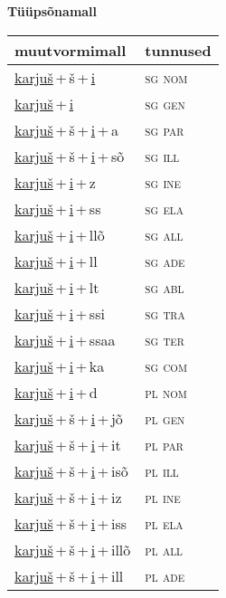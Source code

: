 
\vspace{1.8em}
\begin{minipage}{\textwidth}
\textbf{Tüüpsõnamall \,}\\

\begin{sideways}
\begin{tabular}{l l}
muutvormimall & tunnused \\
\hline
\underline{karjuš}\,+\,š\,+\,\underline{i} & \textsc{ sg nom } \\
\underline{karjuš}\,+\,\underline{i} & \textsc{ sg gen } \\
\underline{karjuš}\,+\,š\,+\,\underline{i}\,+\,a & \textsc{ sg par } \\
\underline{karjuš}\,+\,š\,+\,\underline{i}\,+\,sõ & \textsc{ sg ill } \\
\underline{karjuš}\,+\,\underline{i}\,+\,z & \textsc{ sg ine } \\
\underline{karjuš}\,+\,\underline{i}\,+\,ss & \textsc{ sg ela } \\
\underline{karjuš}\,+\,\underline{i}\,+\,llõ & \textsc{ sg all } \\
\underline{karjuš}\,+\,\underline{i}\,+\,ll & \textsc{ sg ade } \\
\underline{karjuš}\,+\,\underline{i}\,+\,lt & \textsc{ sg abl } \\
\underline{karjuš}\,+\,\underline{i}\,+\,ssi & \textsc{ sg tra } \\
\underline{karjuš}\,+\,\underline{i}\,+\,ssaa & \textsc{ sg ter } \\
\underline{karjuš}\,+\,\underline{i}\,+\,ka & \textsc{ sg com } \\
\underline{karjuš}\,+\,\underline{i}\,+\,d & \textsc{ pl nom } \\
\underline{karjuš}\,+\,š\,+\,\underline{i}\,+\,jõ & \textsc{ pl gen } \\
\underline{karjuš}\,+\,š\,+\,\underline{i}\,+\,it & \textsc{ pl par } \\
\underline{karjuš}\,+\,š\,+\,\underline{i}\,+\,isõ & \textsc{ pl ill } \\
\underline{karjuš}\,+\,š\,+\,\underline{i}\,+\,iz & \textsc{ pl ine } \\
\underline{karjuš}\,+\,š\,+\,\underline{i}\,+\,iss & \textsc{ pl ela } \\
\underline{karjuš}\,+\,š\,+\,\underline{i}\,+\,illõ & \textsc{ pl all } \\
\underline{karjuš}\,+\,š\,+\,\underline{i}\,+\,ill & \textsc{ pl ade } \\

\end{tabular}
\end{sideways}
\end{minipage}
